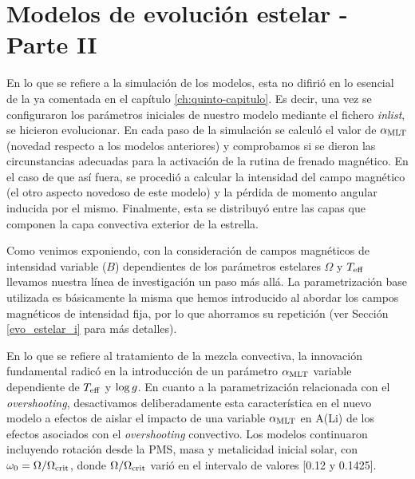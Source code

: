 \section{Modelos de evolución estelar - Parte II}  \label{evo_estelar_ii}
En lo que se refiere a la simulación de los modelos, esta no difirió en lo esencial de la ya comentada en el capítulo \ref{ch:quinto-capitulo}. Es decir, una vez se configuraron los parámetros iniciales de nuestro modelo mediante el fichero \textit{inlist}, se hicieron evolucionar. En cada paso de la simulación se calculó el valor de $\alpha_{\mathrm{MLT}}$ (novedad respecto a los modelos anteriores) y comprobamos si se dieron las circunstancias adecuadas para la activación de la rutina de frenado magnético. En el caso de que así fuera, se procedió a calcular la intensidad del campo magnético (el otro aspecto novedoso de este modelo) y la pérdida de momento angular inducida por el mismo. Finalmente, esta se distribuyó entre las capas que componen la capa convectiva exterior de la estrella.\par

Como venimos exponiendo, con la consideración de campos magnéticos de intensidad variable ($B$) dependientes de los parámetros estelares $\Omega$ y $T_{\mathrm{eff}}$ llevamos nuestra línea de investigación un paso más allá. La parametrización base utilizada es básicamente la misma que hemos introducido al abordar los campos magnéticos de intensidad fija, por lo que ahorramos su repetición (ver Sección \ref{evo_estelar_i} para más detalles).\par 

En lo que se refiere al tratamiento de la mezcla convectiva, la innovación fundamental radicó en la introducción de un parámetro $\alpha_{\mathrm{MLT}}$ variable dependiente de $T_{\mathrm{eff}}$ y $\mathrm{log} \, g$. En cuanto a la parametrización relacionada con el \textit{overshooting}, desactivamos deliberadamente esta característica en el nuevo modelo a efectos de aislar el impacto de una variable $\alpha_{\mathrm{MLT}}$ en A(Li) de los efectos asociados con el \textit{overshooting} convectivo. Los modelos continuaron incluyendo rotación desde la PMS, masa y metalicidad inicial solar, con $\omega_{\mathrm{0}} = \Omega / \Omega_{\mathrm{crit}}$, donde $\Omega / \Omega_{\mathrm{crit}}$ varió en el intervalo de valores [0.12 y 0.1425].\par

